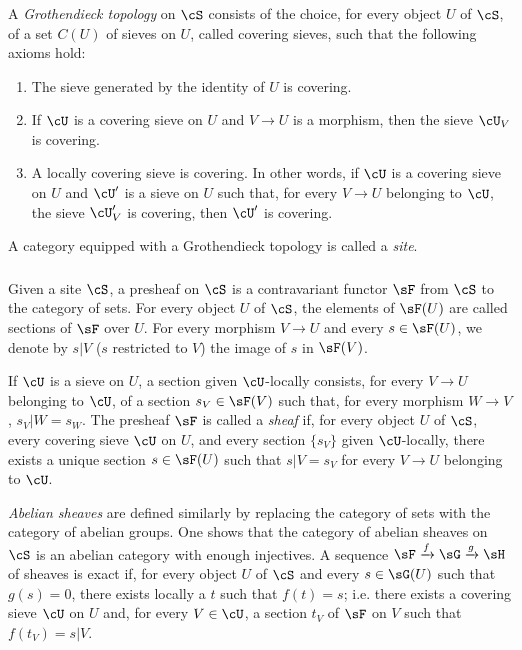 \subsubsection{}\label{I:1-6-2}

A \emph{Grothendieck topology} on $\cS$ consists of the choice, for every
object $U$ of $\cS$, of a set $C(U)$ of sieves on $U$, called
covering sieves, such that the following axioms hold:
\begin{enumerate}[\indent a)]
  \item The sieve generated by the identity of $U$ is covering.
  \item If $\cU$ is a covering sieve on $U$ and $V\to U$ is a
    morphism, then the sieve $\cU_V$ is covering.
  \item A locally covering sieve is covering. In other words, if $\cU$
    is a covering sieve on $U$ and $\cU'$ is a sieve on $U$ such that,
    for every $V\to U$ belonging to $\cU$, the sieve $\cU_V'$ is
    covering, then $\cU'$ is covering.
\end{enumerate}

A category equipped with a Grothendieck topology is called a \emph{site}.

\subsubsection{}\label{I:1-6-3}

Given a site $\cS$, a presheaf on $\cS$ is a contravariant functor
$\sF$ from $\cS$ to the category of sets. For every object $U$ of
$\cS$, the elements of $\sF(U)$ are called sections of $\sF$ over
$U$. For every morphism $V\to U$ and every $s\in\sF(U)$, we denote by
$s|V$ ($s$ restricted to $V$) the image of $s$ in $\sF(V)$.

If $\cU$ is a sieve on $U$, a section given $\cU$-locally consists,
for every $V\to U$ belonging to $\cU$, of a section
$s_V\in\sF(V)$ such that, for every morphism $W\to V$,
$s_V|W=s_W$. The presheaf $\sF$ is called a \emph{sheaf} if, for every
object $U$ of $\cS$, every covering sieve $\cU$ on $U$, and every
section $\{s_V\}$ given $\cU$-locally, there exists a unique section
$s\in\sF(U)$ such that $s|V=s_V$ for every $V\to U$ belonging to
$\cU$.

\emph{Abelian sheaves} are defined similarly by replacing the category of
sets with the category of abelian groups. One shows that the category of
abelian sheaves on $\cS$ is an abelian category with enough injectives. A
sequence $\sF\xrightarrow f\sG\xrightarrow g\sH$ of sheaves is exact if,
for every object $U$ of $\cS$ and every $s\in\sG(U)$ such that
$g(s)=0$, there exists locally a $t$ such that $f(t)=s$; i.e. there
exists a covering sieve $\cU$ on $U$ and, for every $V\in\cU$, a
section $t_V$ of $\sF$ on $V$ such that $f(t_V)=s|V$.

